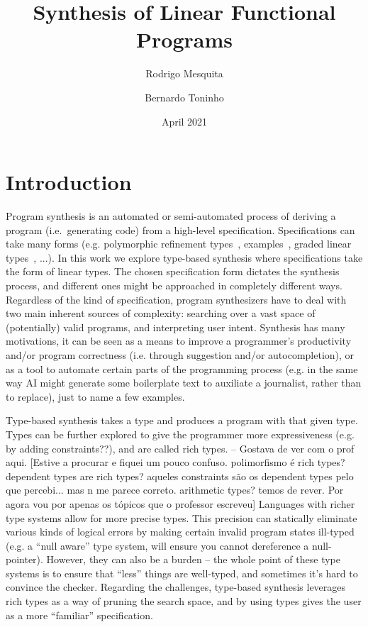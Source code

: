 \documentclass{llncs}
\title{Synthesis of Linear Functional Programs}
\author{Rodrigo Mesquita \and Bernardo Toninho}
\date{April 2021}
\institute{NOVA School of Science and Technology}
\begin{document}
\maketitle

\section{Introduction}

Program synthesis is an automated or semi-automated process of
deriving a program (i.e.~generating code) from a high-level specification.
Specifications can take many forms (e.g.  polymorphic refinement
types~\cite{DBLP:conf/pldi/PolikarpovaKS16},
examples~\cite{DBLP:conf/popl/FrankleOWZ16}, graded linear
types~\cite{DBLP:conf/lopstr/HughesO20}, ...).  In this work we
explore type-based synthesis where specifications take the form of
linear types.
%
The chosen specification form dictates the synthesis process, and
different ones might be approached in completely different
ways.
%
Regardless of the kind of specification, program synthesizers have to
deal with two main inherent sources of complexity: searching over a
vast space of (potentially) valid programs, and interpreting user
intent.
%
Synthesis has many motivations, it can be seen as a means to
improve a programmer's productivity and/or program correctness
(i.e. through suggestion and/or autocompletion), or as a tool to
automate certain parts of the programming process (e.g. in the same
way AI might generate some boilerplate text to auxiliate a journalist,
rather than to replace), just to name a few examples.


Type-based synthesis takes a type and produces a program with that
given type.  Types can be further explored to give the programmer more
expressiveness (e.g. by adding constraints??), and are called rich
types.  -- Gostava de ver com o prof aqui. [Estive a procurar e fiquei
um pouco confuso. polimorfismo é rich types?  dependent types are rich
types? aqueles constraints são os dependent types pelo que
percebi... mas n me parece correto. arithmetic types? temos de
rever. Por agora vou por apenas os tópicos que o professor escreveu]
Languages with richer type systems allow for more precise types. This
precision can statically eliminate various kinds of logical errors by
making certain invalid program states ill-typed (e.g. a ``null aware''
type system, will ensure you cannot dereference a null-pointer).
However, they can also be a burden -- the whole point of these type
systems is to ensure that ``less'' things are well-typed, and
sometimes it's hard to convince the checker.  Regarding the
challenges, type-based synthesis leverages rich types as a way of
pruning the search space, and by using types gives the user as a more
``familiar'' specification.
\end{document}
